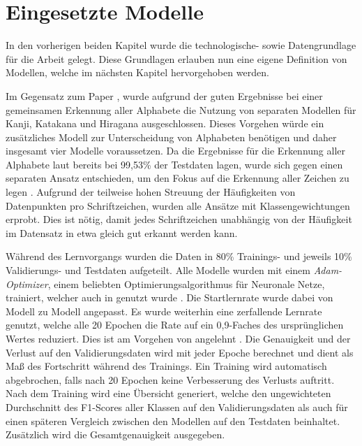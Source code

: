 \documentclass[twoside,a4paper]{IEEEtran}
\begin{document}
\section{Eingesetzte Modelle}
In den vorherigen beiden Kapitel wurde die technologische- sowie Datengrundlage für die Arbeit gelegt. Diese Grundlagen erlauben nun eine eigene Definition von Modellen, welche im nächsten Kapitel hervorgehoben werden. 

Im Gegensatz zum Paper \cite{RHC}, wurde aufgrund der guten Ergebnisse bei einer gemeinsamen Erkennung aller Alphabete die Nutzung von separaten Modellen für Kanji, Katakana und Hiragana ausgeschlossen. Dieses Vorgehen würde ein zusätzliches Modell zur Unterscheidung von Alphabeten benötigen und daher insgesamt vier Modelle voraussetzen. Da die Ergebnisse für die Erkennung aller Alphabete laut \cite{RHC} bereits bei 99,53\% der Testdaten lagen, wurde sich gegen einen separaten Ansatz entschieden, um den Fokus auf die Erkennung aller Zeichen zu legen \cite[S.4-6]{RHC}. Aufgrund der teilweise hohen Streuung der Häufigkeiten von Datenpunkten pro Schriftzeichen, wurden alle Ansätze mit Klassengewichtungen erprobt. Dies ist nötig, damit jedes Schriftzeichen unabhängig von der Häufigkeit im Datensatz in etwa gleich gut erkannt werden kann.

Während des Lernvorgangs wurden die Daten in 80\% Trainings- und jeweils 10\% Validierungs- und Testdaten aufgeteilt. Alle Modelle wurden mit einem \emph{Adam-Optimizer}, einem beliebten Optimierungsalgorithmus für Neuronale Netze, trainiert, welcher auch in \cite{RHC} genutzt wurde \cite[S.4]{RHC}. Die Startlernrate wurde dabei von Modell zu Modell angepasst. Es wurde weiterhin eine zerfallende Lernrate genutzt, welche alle 20 Epochen die Rate auf ein 0,9-Faches des ursprünglichen Wertes reduziert. Dies ist am Vorgehen von \cite{RHC} angelehnt \cite[S.4]{RHC}. Die Genauigkeit und der Verlust auf den Validierungsdaten wird mit jeder Epoche berechnet und dient als Maß des Fortschritt während des Trainings. Ein Training wird automatisch abgebrochen, falls nach 20 Epochen keine Verbesserung des Verlusts auftritt. Nach dem Training wird eine Übersicht generiert, welche den ungewichteten Durchschnitt des F1-Scores aller Klassen auf den Validierungsdaten als auch für einen späteren Vergleich zwischen den Modellen auf den Testdaten beinhaltet. Zusätzlich wird die Gesamtgenauigkeit ausgegeben.
\end{document}
